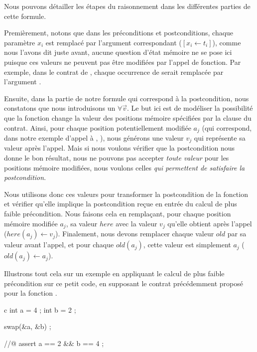 Nous pouvons détailler les étapes du raisonnement dans les différentes parties de
cette formule.


Premièrement, notons que dans les préconditions et postconditions, chaque paramètre $x_i$
est remplacé par l'argument correspondant ($[x_i \leftarrow t_i]$), comme nous
l'avons dit juste avant, aucune question d'état mémoire ne se pose
ici puisque ces valeurs ne peuvent pas être modifiées par l'appel de fonction. Par
exemple, dans le contrat de , chaque occurrence de 
serait remplacée par l'argument .


Ensuite, dans la partie de notre formule qui correspond à la postcondition, nous
constatons que nous introduisons un $\forall \vec{v}$. Le but ici est de modéliser
la possibilité que la fonction change la valeur des positions mémoire spécifiées par
la clause  du contrat. Ainsi, pour chaque position potentiellement
modifiée $a_j$ (qui correspond, dans notre exemple d'appel à ,
), nous générons une valeur $v_j$ qui représente sa valeur après
l'appel. Mais si nous voulons vérifier que la postcondition nous donne le bon
résultat, nous ne pouvons pas accepter \textit{toute valeur} pour les positions mémoire
modifiées, nous voulons celles \textit{qui permettent de satisfaire la postcondition}.



Nous utilisons donc ces valeurs pour transformer la postcondition de la fonction et
vérifier qu'elle implique la postcondition reçue en entrée du calcul de plus
faible précondition. Nous faisons cela en remplaçant, pour chaque position mémoire
modifiée $a_j$, sa valeur $here$ avec la valeur $v_j$ qu'elle obtient après l'appel
($here(a_j) \leftarrow v_j$). Finalement, nous devons remplacer chaque valeur $old$
par sa valeur avant l'appel, et pour chaque $old(a_j)$, cette valeur est
simplement $a_j$ ($old(a_j) \leftarrow a_j$).





Illustrons tout cela sur un exemple en appliquant le calcul de plus faible
précondition sur ce petit code, en supposant le contrat précédemment proposé pour
la fonction .

\begin{CodeBlock}{c}
  int a = 4 ;
  int b = 2 ;

  swap(&a, &b) ;

  //@ assert a == 2 && b == 4 ;
\end{CodeBlock}


